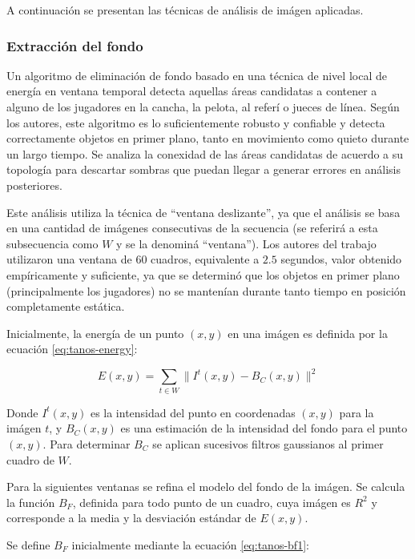 \documentclass[a4paper,10pt]{article}
\begin{document}
A continuación se presentan las técnicas de análisis de imágen aplicadas.

\subsubsection{Extracción del fondo}
Un algoritmo de eliminación de fondo basado en una técnica de nivel local de
energía en ventana temporal detecta aquellas áreas candidatas a contener a
alguno de los jugadores en la cancha, la pelota, al referí o jueces de línea.
Según los autores, este algoritmo es lo suficientemente robusto y confiable y
detecta correctamente objetos en primer plano, tanto en movimiento como quieto
durante un largo tiempo. Se analiza la conexidad de las áreas candidatas de
acuerdo a su topología para descartar sombras que puedan llegar a generar
errores en análisis posteriores.

Este análisis utiliza la técnica de ``ventana deslizante'', ya que el análisis
se basa en una cantidad de imágenes consecutivas de la secuencia (se referirá a
esta subsecuencia como $W$ y se la denominá ``ventana''). Los autores del
trabajo utilizaron una ventana de 60 cuadros, equivalente a $2.5$ segundos,
valor obtenido empíricamente y suficiente, ya que se determinó que los objetos
en primer plano (principalmente los jugadores) no se mantenían durante tanto
tiempo en posición completamente estática.

Inicialmente, la energía de un punto $(x, y)$ en una imágen es definida por la
ecuación \ref{eq:tanos-energy}:

\begin{equation}
    \label{eq:tanos-energy}
    E(x, y) = \sum_{t \in W} \| I^t(x, y) - B_C (x, y) \| ^2
\end{equation}

Donde  $I^t(x, y)$ es la intensidad del punto en coordenadas $(x, y)$ para la
imágen $t$, y $B_C(x, y)$ es una estimación de la intensidad del fondo para el
punto $(x, y)$. Para determinar $B_C$ se aplican sucesivos filtros gaussianos
al primer cuadro de $W$.

Para la siguientes ventanas se refina el modelo del fondo de la imágen. Se
calcula la función $B_F$, definida para todo punto de un cuadro, cuya imágen es
$R^2$ y corresponde a la media y la desviación estándar de $E(x, y)$.

Se define $B_F$ inicialmente mediante la ecuación \ref{eq:tanos-bf1}:
\end{document}
